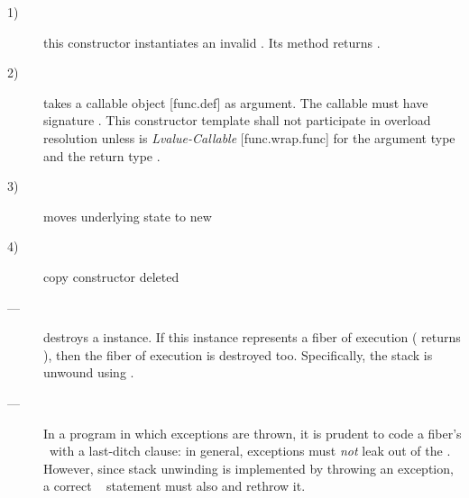 \begin{description}
    \item[1)] this constructor instantiates an invalid \fiber. Its  method
              returns .
    \item[2)] takes a callable object [func.def] as
              argument. The callable must have signature . This constructor template shall not
              participate in overload resolution unless 
              is \emph{Lvalue-Callable} [func.wrap.func] for the argument
              type  and the return type \fiber.
               
    \item[3)] moves underlying state to new \fiber
    \item[4)] copy constructor deleted
\end{description}


\effects
\begin{description}
    \item[---] destroys a \fiber instance. If this instance represents a fiber
              of execution ( returns ), then the fiber of
              execution is destroyed too. Specifically, the stack is unwound
              using \unwindfib.
\end{description}

\remarks
\begin{description}
    \item[---] In a program in which exceptions
              are thrown, it is prudent to code a fiber's \entryfn\ with a
              last-ditch  clause: in general, exceptions must
              \emph{not} leak out of the \entryfn. However, since stack
              unwinding is implemented by throwing an exception, a correct
              \entryfn\  statement must also
               and rethrow it.
\end{description}

